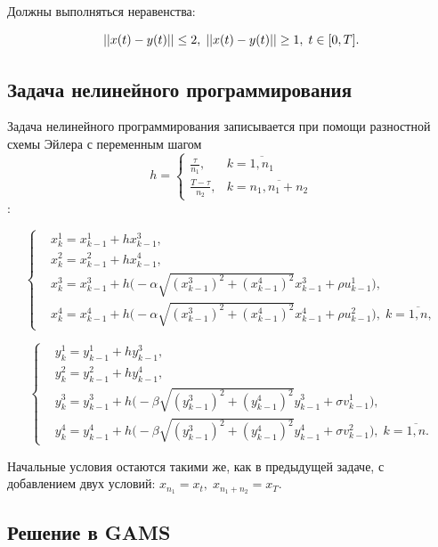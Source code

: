 \documentclass[14pt]{article}
\begin{document}
Должны выполняться неравенства:

$$
    ||x(t)-y(t)|| \le 2, \; ||x(t)-y(t)|| \ge 1, \; t \in [0,T]. \\
$$


\subsection{Задача нелинейного программирования}

Задача нелинейного программирования записывается при помощи разностной схемы Эйлера с переменным шагом $$h = \begin{cases} \frac{\tau}{n_1}, & k=\overline{1,n_1} \\  \frac{T-\tau}{n_2}, & k=\overline{n_1,n_1+n_2} \end{cases} $$:

\begin{equation}\label{NLP3}
\left\{ \begin{aligned}
& x^1_{k} = x^1_{k-1} + h x^3_{k-1}, \\
& x^2_{k} = x^2_{k-1} + h x^4_{k-1}, \\
& x^3_{k} = x^3_{k-1} + h \Big(-\alpha \sqrt{(x^3_{k-1})^2+(x^4_{k-1})^2} x^3_{k-1} + \rho u^1_{k-1} \Big), \\
& x^4_{k} = x^4_{k-1} + h \Big(-\alpha \sqrt{(x^3_{k-1})^2+(x^4_{k-1})^2} x^4_{k-1} + \rho u^2_{k-1} \Big), \; k = \overline{1,n},
\end{aligned}\right.
\end{equation}

\begin{equation}\label{NLP32}
\left\{ \begin{aligned}
& y^1_{k} = y^1_{k-1} + h y^3_{k-1}, \\
& y^2_{k} = y^2_{k-1} + h y^4_{k-1}, \\
& y^3_{k} = y^3_{k-1} + h \Big(-\beta \sqrt{(y^3_{k-1})^2+(y^4_{k-1})^2} y^3_{k-1} + \sigma v^1_{k-1} \Big), \\
& y^4_{k} = y^4_{k-1} + h \Big(-\beta \sqrt{(y^3_{k-1})^2+(y^4_{k-1})^2} y^4_{k-1} + \sigma v^2_{k-1} \Big), \; k = \overline{1,n}.
\end{aligned}\right.
\end{equation}

Начальные условия остаются такими же, как в предыдущей задаче, с добавлением двух условий: $x_{n_1} = x_t, \; x_{n_1+n_2} = x_T$.

\subsection{Решение в GAMS}
\end{document}
